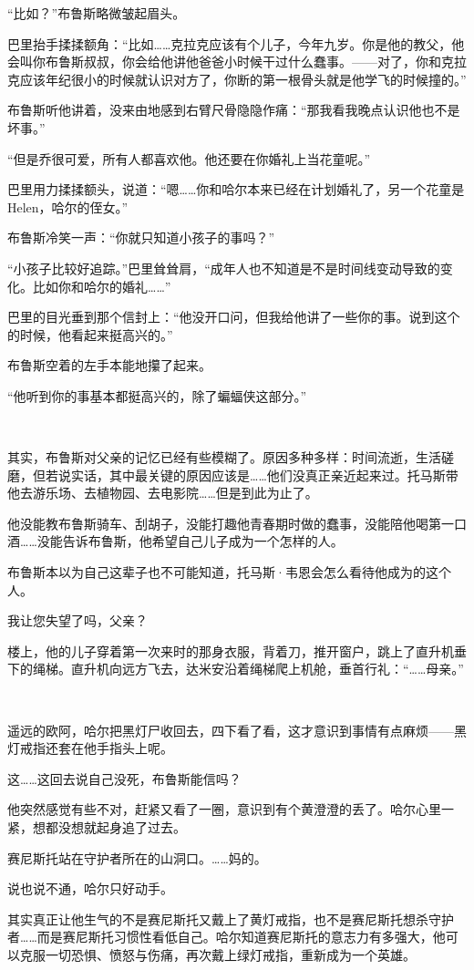\documentclass[../main]{subfiles}
\begin{document}
“比如？”布鲁斯略微皱起眉头。

巴里抬手揉揉额角：“比如……克拉克应该有个儿子，今年九岁。你是他的教父，他会叫你布鲁斯叔叔，你会给他讲他爸爸小时候干过什么蠢事。——对了，你和克拉克应该年纪很小的时候就认识对方了，你断的第一根骨头就是他学飞的时候撞的。”

布鲁斯听他讲着，没来由地感到右臂尺骨隐隐作痛：“那我看我晚点认识他也不是坏事。”

“但是乔很可爱，所有人都喜欢他。他还要在你婚礼上当花童呢。”

巴里用力揉揉额头，说道：“嗯……你和哈尔本来已经在计划婚礼了，另一个花童是Helen，哈尔的侄女。”

布鲁斯冷笑一声：“你就只知道小孩子的事吗？”

“小孩子比较好追踪。”巴里耸耸肩，“成年人也不知道是不是时间线变动导致的变化。比如你和哈尔的婚礼……”

巴里的目光垂到那个信封上：“他没开口问，但我给他讲了一些你的事。说到这个的时候，他看起来挺高兴的。”

布鲁斯空着的左手本能地攥了起来。

“他听到你的事基本都挺高兴的，除了蝙蝠侠这部分。”

~\

其实，布鲁斯对父亲的记忆已经有些模糊了。原因多种多样：时间流逝，生活磋磨，但若说实话，其中最关键的原因应该是……他们没真正亲近起来过。托马斯带他去游乐场、去植物园、去电影院……但是到此为止了。

他没能教布鲁斯骑车、刮胡子，没能打趣他青春期时做的蠢事，没能陪他喝第一口酒……没能告诉布鲁斯，他希望自己儿子成为一个怎样的人。

布鲁斯本以为自己这辈子也不可能知道，托马斯·韦恩会怎么看待他成为的这个人。

我让您失望了吗，父亲？

楼上，他的儿子穿着第一次来时的那身衣服，背着刀，推开窗户，跳上了直升机垂下的绳梯。直升机向远方飞去，达米安沿着绳梯爬上机舱，垂首行礼：“……母亲。”

~\

遥远的欧阿，哈尔把黑灯尸收回去，四下看了看，这才意识到事情有点麻烦——黑灯戒指还套在他手指头上呢。

这……这回去说自己没死，布鲁斯能信吗？

他突然感觉有些不对，赶紧又看了一圈，意识到有个黄澄澄的丢了。哈尔心里一紧，想都没想就起身追了过去。

赛尼斯托站在守护者所在的山洞口。……妈的。

说也说不通，哈尔只好动手。

其实真正让他生气的不是赛尼斯托又戴上了黄灯戒指，也不是赛尼斯托想杀守护者……而是赛尼斯托习惯性看低自己。哈尔知道赛尼斯托的意志力有多强大，他可以克服一切恐惧、愤怒与伤痛，再次戴上绿灯戒指，重新成为一个英雄。
\end{document}
